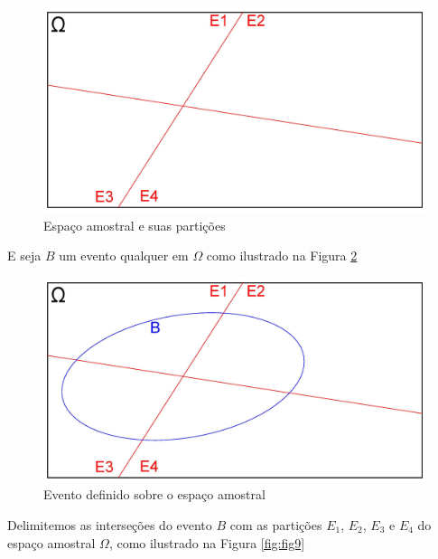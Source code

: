 \documentclass[
]{book}
\begin{document}
\hfill\break

\begin{figure}

{\centering \includegraphics[width=0.8\linewidth]{images4/bayes_2} 

}

\caption{Espaço amostral e suas partições}\label{fig:fig7}
\end{figure}

\hfill\break

E seja \(B\) um evento qualquer em \(\Omega\) como ilustrado na Figura \ref{fig:fig8}

\hfill\break

\begin{figure}

{\centering \includegraphics[width=0.8\linewidth]{images4/bayes_3} 

}

\caption{Evento definido sobre o espaço amostral}\label{fig:fig8}
\end{figure}

\hfill\break

Delimitemos as interseções do evento \(B\) com as partições \(E_{1}\), \(E_{2}\), \(E_{3}\) e \(E_{4}\) do espaço amostral \(\Omega\), como ilustrado na Figura \ref{fig:fig9}

\hfill\break
\end{document}
